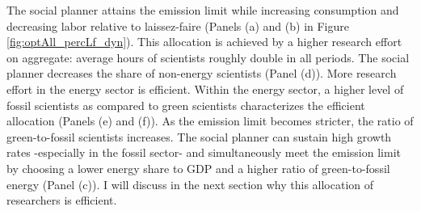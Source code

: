 %
The social planner attains the emission limit while increasing consumption and decreasing labor  relative to laissez-faire (Panels (a) and (b) in Figure \ref{fig:optAll_percLf_dyn}). This allocation is achieved by a higher research effort on aggregate: average hours of scientists roughly double in all periods. The social planner decreases the share of non-energy scientists (Panel (d)). More research effort in the energy sector is efficient. Within the energy sector, a higher level of fossil scientists as compared to green scientists characterizes the efficient allocation (Panels (e) and (f)). As the emission limit becomes stricter, the ratio of green-to-fossil scientists increases.
The social planner can sustain high growth rates -especially in the fossil sector- and simultaneously meet the emission limit by choosing a lower energy share to GDP and a higher ratio of green-to-fossil energy (Panel (c)).  I will discuss in the next section why this allocation of researchers is efficient.


